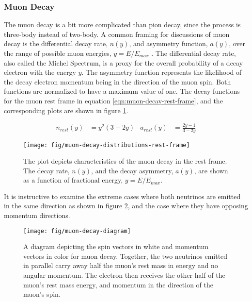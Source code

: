 \subsubsection{Muon Decay}

The muon decay is a bit more complicated than pion decay, since the process is three-body instead of two-body.  A common framing for discussions of muon decay is the differential decay rate, $n(y)$, and asymmetry function, $a(y)$, over the range of possible muon energies, $y=E/E_{max}$ \cite{e989-tdr}.  The differential decay rate, also called the Michel Spectrum, is a proxy for the overall probability of a decay electron with the energy $y$.  The asymmetry function represents the likelihood of the decay electron momentum being in the direction of the muon spin.  Both functions are normalized to have a maximum value of one.  The decay functions for the muon rest frame in equation \ref{eqn:muon-decay-rest-frame}, and the corresponding plots are shown in figure \ref{fig:muon-decay-rest-frame}.

\begin{align}
\label{eqn:muon-decay-rest-frame}
n_{rest}(y) & = y^2(3 - 2 y) & a_{rest}(y) & = \frac{2 y - 1}{3 - 2y}
\end{align}

\begin{figure}
\centering
\texttt{[image: fig/muon-decay-distributions-rest-frame]}
\caption{
    The plot depicts characteristics of the muon decay in the rest frame.  The decay rate, $n(y)$, and the decay asymmetry, $a(y)$, are shown as a function of fractional energy, $y=E/E_{max}$.
    \label{fig:muon-decay-rest-frame}
}
\end{figure}

It is instructive to examine the extreme cases where both neutrinos are emitted in the same direction as shown in figure \ref{fig:muon-decay-diagram}, and the case where they have opposing momentum directions. 

\begin{figure}
\centering
\texttt{[image: fig/muon-decay-diagram]}
\caption{
    A diagram depicting the spin vectors in white and momentum vectors in color for muon decay. Together, the two neutrinos emitted in parallel carry away half the muon's rest mass in energy and no angular momentum.  The electron then receives the other half of the muon's rest mass energy, and momentum in the direction of the muon's spin. 
    \label{fig:muon-decay-diagram}
}
\end{figure}

